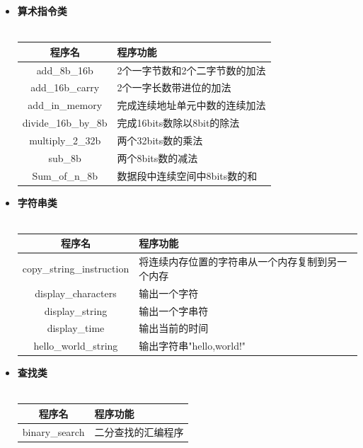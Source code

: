 \documentclass[UTF8,12pt]{article}
\begin{document}
\begin{itemize}
	        \item \textbf{算术指令类} \\ \\
	            \begin{tabular}{c|l}
	                \hline
        	        程序名 & 程序功能 \\
        	        \hline
        	        add\_8b\_16b & 2个一字节数和2个二字节数的加法 \\ \hline
        	        add\_16b\_carry & 2个一字长数带进位的加法 \\ \hline
        	        add\_in\_memory & 完成连续地址单元中数的连续加法 \\ \hline
        	        divide\_16b\_by\_8b & 完成16bits数除以8bit的除法 \\ \hline
        	        multiply\_2\_32b & 两个32bits数的乘法 \\ \hline
        	        sub\_8b & 两个8bits数的减法 \\ \hline
        	        Sum\_of\_n\_8b & 数据段中连续空间中8bits数的和 \\ \hline
    	        \end{tabular}
    	        
    	    \item \textbf{字符串类} \\ \\
	            \begin{tabular}{c|l}
	                \hline
        	        程序名 & 程序功能 \\
        	        \hline
        	        copy\_string\_instruction & 将连续内存位置的字符串从一个内存复制到另一个内存 \\ \hline
        	        display\_characters & 输出一个字符 \\ \hline
        	        display\_string & 输出一个字串符 \\ \hline
        	        display\_time & 输出当前的时间 \\ \hline
        	        hello\_world\_string & 输出字符串"hello,world!" \\ \hline 
    	        \end{tabular}
    	        
    	   \item \textbf{查找类} \\ \\
	            \begin{tabular}{c|l}
	                \hline
        	        程序名 & 程序功能 \\
        	        \hline
        	        binary\_search & 二分查找的汇编程序 \\ \hline
    	        \end{tabular}
    	        

\end{itemize}
\end{document}
